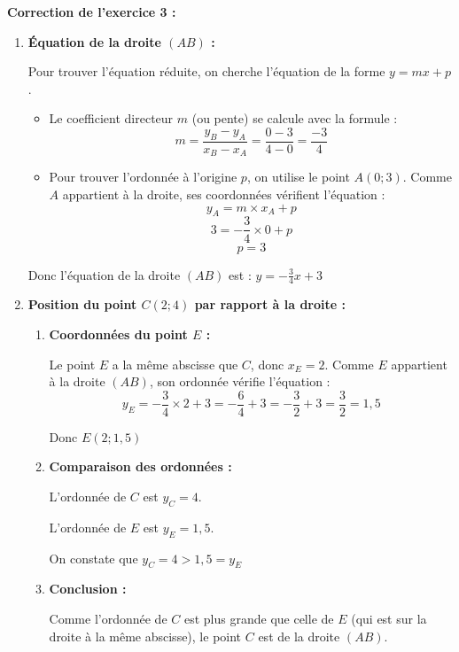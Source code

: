 \textbf{Correction de l'exercice 3 :}
		\begin{enumerate}
			\item \textbf{Équation de la droite $(AB)$ :}

			      Pour trouver l'équation réduite, on cherche l'équation de la forme $y = mx + p$.

			      \begin{itemize}
				      \item Le coefficient directeur $m$ (ou pente) se calcule avec la formule :
				            $$m = \frac{y_B - y_A}{x_B - x_A} = \frac{0 - 3}{4 - 0} = \frac{-3}{4}$$

				      \item Pour trouver l'ordonnée à l'origine $p$, on utilise le point $A(0;3)$. Comme $A$ appartient à la droite, ses coordonnées vérifient l'équation :
				            $$y_A = m \times x_A + p$$
				            $$3 = -\frac{3}{4} \times 0 + p$$
				            $$p = 3$$
			      \end{itemize}

			      Donc l'équation de la droite $(AB)$ est : $\boxed{y = -\frac{3}{4}x + 3}$

			\item \textbf{Position du point $C(2;4)$ par rapport à la droite :}
			      \begin{enumerate}
				      \item \textbf{Coordonnées du point $E$ :}

				            Le point $E$ a la même abscisse que $C$, donc $x_E = 2$. Comme $E$ appartient à la droite $(AB)$, son ordonnée vérifie l'équation :
				            $$y_E = -\frac{3}{4} \times 2 + 3 = -\frac{6}{4} + 3 = -\frac{3}{2} + 3 = \frac{3}{2} = 1,5$$

				            Donc $\boxed{E(2;1,5)}$

				      \item \textbf{Comparaison des ordonnées :}

				            L'ordonnée de $C$ est $y_C = 4$.

				            L'ordonnée de $E$ est $y_E = 1,5$.

				            On constate que $y_C = 4 > 1,5 = y_E$

				      \item \textbf{Conclusion :}

				            Comme l'ordonnée de $C$ est plus grande que celle de $E$ (qui est sur la droite à la même abscisse), le point $C$ est  de la droite $(AB)$.
			      \end{enumerate}


\end{enumerate}
